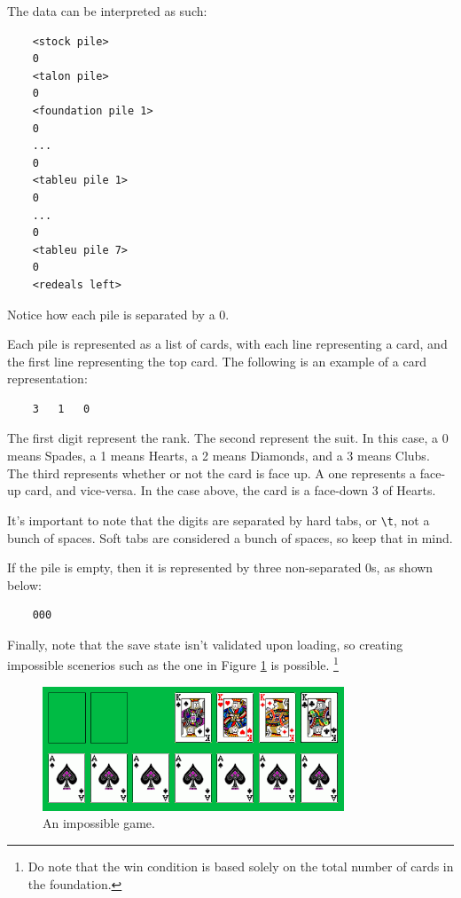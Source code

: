 \documentclass[12pt,a4paper,titlepage]{article}
\begin{document}
	The data can be interpreted as such:
	\begin{verbatim}
	<stock pile>
	0
	<talon pile>
	0
	<foundation pile 1>
	0
	...
	0
	<tableu pile 1>
	0
	...
	0
	<tableu pile 7>
	0
	<redeals left>
	\end{verbatim}
	Notice how each pile is separated by a 0.

	Each pile is represented as a list of cards, with each line representing
	a card, and the first line representing the top card. The following is an
	example of a card representation:
	\begin{verbatim}
	3	1	0
	\end{verbatim}

	The first digit represent the rank. The second represent the suit. In this
	case, a 0 means Spades, a 1 means Hearts, a 2 means Diamonds, and a 3 means
	Clubs. The third represents whether or not the card is face up. A one
	represents a face-up card, and vice-versa. In the case above, the card is
	a face-down 3 of Hearts.

	It's important to note that the digits are separated by hard tabs, or
	\verb|\t|, not a bunch of spaces. Soft tabs are considered a bunch of
	spaces, so keep that in mind.

	If the pile is empty, then it is represented by three non-separated 0s, as
	shown below:
	\begin{verbatim}
	000
	\end{verbatim}

	Finally, note that the save state isn't validated upon loading, so creating
	impossible scenerios such as the one in Figure \ref{fig:fig7} is possible.
	\footnote{Do note that the win condition is based solely on the total number
	of cards in the foundation.}

	\begin{figure}[H]
		\centering
		\captionsetup{justification=centering}
		\includegraphics[width=9cm]{images/fig7.png}
		\caption{An impossible game.}
		\label{fig:fig7}
	\end{figure}
\end{document}
